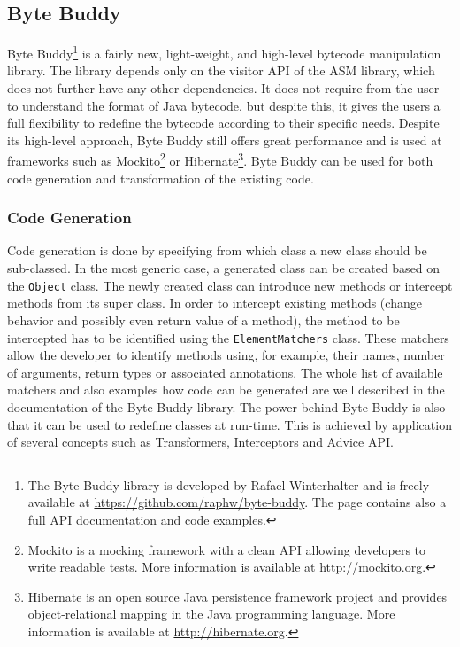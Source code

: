 \subsection{Byte Buddy}
\label{sec:byte_buddy}
Byte Buddy\footnote{The Byte Buddy library is developed by Rafael Winterhalter and is freely available at \url{https://github.com/raphw/byte-buddy}. The page contains also a full API documentation and code examples.} is a fairly new, light-weight, and high-level bytecode manipulation library. The library depends only on the visitor API of the ASM library, which does not further have any other dependencies. It does not require from the user to understand the format of Java bytecode, but despite this, it gives the users a full flexibility to redefine the bytecode according to their specific needs. Despite its high-level approach, Byte Buddy still offers great performance \cite{ByteBuddy_Perf} and is used at frameworks such as Mockito\footnote{Mockito is a mocking framework with a clean API allowing developers to write readable tests. More information is available at \url{http://mockito.org}.} or Hibernate\footnote{Hibernate is an open source Java persistence framework project and provides object-relational mapping in the Java programming language. More information is available at \url{http://hibernate.org}.}. Byte Buddy can be used for both code generation and transformation of the existing code.

\subsubsection{Code Generation}
Code generation is done by specifying from which class a new class should be sub-classed. In the most generic case, a generated class can be created based on the \texttt{Object} class. The newly created class can introduce new methods or intercept methods from its super class. In order to intercept existing methods (change behavior and possibly even return value of a method), the method to be intercepted has to be identified using the \texttt{ElementMatchers} class. These matchers allow the developer to identify methods using, for example, their names, number of arguments, return types or associated annotations. The whole list of available matchers and also examples how code can be generated are well described in the documentation of the Byte Buddy library. The power behind Byte Buddy is also that it can be used to redefine classes at run-time. This is achieved by application of several concepts such as Transformers, Interceptors and Advice API.


